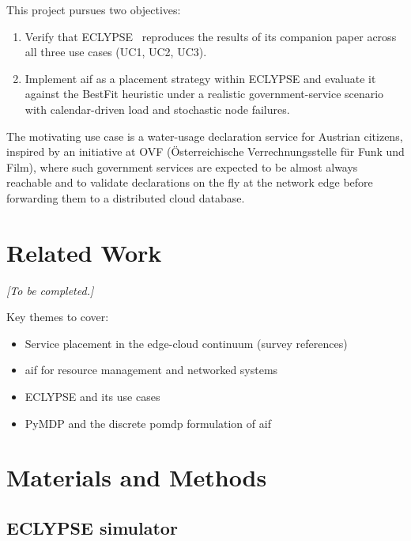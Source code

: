\documentclass[11pt, a4paper]{article}
\begin{document}
This project pursues two objectives:
\begin{enumerate}
  \item Verify that ECLYPSE~\cite{eclypse} reproduces the results of its
        companion paper across all three use cases (UC1, UC2, UC3).
  \item Implement \gls{aif} as a placement strategy within ECLYPSE and
        evaluate it against the BestFit heuristic under a realistic
        government-service scenario with calendar-driven load and stochastic
        node failures.
\end{enumerate}

The motivating use case is a water-usage declaration service for Austrian
citizens, inspired by an initiative at OVF (\"Osterreichische Verrechnungsstelle
f\"ur Funk und Film), where such government services are expected to be almost
always reachable and to validate declarations on the fly at the network edge
before forwarding them to a distributed cloud database.

\section{Related Work}
\label{sec:related}

\noindent\textit{[To be completed.]}

Key themes to cover:
\begin{itemize}
  \item Service placement in the edge-cloud continuum (survey references)
  \item \Gls{aif} for resource management and networked systems
  \item ECLYPSE and its use cases~\cite{eclypse}
  \item PyMDP and the discrete \gls{pomdp} formulation of \gls{aif}~\cite{pymdp}
\end{itemize}

\section{Materials and Methods}
\label{sec:methods}

\subsection{ECLYPSE simulator}
\label{sec:eclypse}
\end{document}
